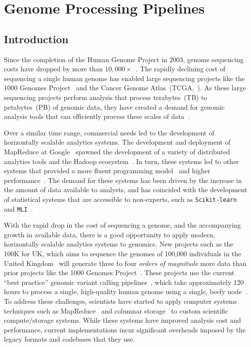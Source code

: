 \documentclass[masters]{ucbthesis}
\begin{document}
\chapter{Genome Processing Pipelines}

\section{Introduction}
\label{sec:introduction}

Since the completion of the Human Genome Project in 2003, genome sequencing costs have dropped
by more than $10,000\times$~\cite{nhgri}. The rapidly declining cost of sequencing a single human
genome has enabled large sequencing projects like the 1000 Genomes Project~\cite{siva08} and
the Cancer Genome Atlas~(TCGA,~\cite{weinstein13}). As these large sequencing projects perform
analysis that process terabytes~(TB) to petabytes~(PB) of genomic data, they have created a demand
for genomic analysis tools that can efficiently process these scales of data~\cite{schadt10, stein10}.

Over a similar time range, commercial needs led to the development of horizontally scalable analytics
systems. The development and deployment of MapReduce at Google~\cite{dean04, dean08} spawned
the development of a variety of distributed analytics tools and the Hadoop ecosystem~\cite{hadoop}.
In turn, these systems led to other systems that provided a more fluent programming
model~\cite{yu08} and higher performance~\cite{zaharia10}. The demand for these systems has
been driven by the increase in the amount of data available to analysts, and has coincided with the
development of statistical systems that are accessible to non-experts, such as
\texttt{Scikit-learn}~\cite{pedregosa11} and \texttt{MLI}~\cite{sparks13}.

With the rapid drop in the cost of sequencing a genome, and the accompanying growth in available data,
there is a good opportunity to apply modern, horizontally scalable analytics systems to genomics. New
projects such as the 100K for UK, which aims to sequence the genomes of 100,000 individuals in the
United Kingdom~\cite{uk100k} will generate three to four \emph{orders of magnitude} more data than
prior projects like the 1000 Genomes Project~\cite{siva08}. These projects use the current ``best
practice'' genomic variant calling pipelines~\cite{auwera13}, which take approximately 120 hours to
process a single, high-quality human genome using a single, beefy node~\cite{talwalkar14}. To address
these challenges, scientists have started to apply computer systems techniques such as
MapReduce~\cite{langmead09, mckenna10, schatz09} and columnar storage~\cite{fritz11} to custom
scientific compute/storage systems. While these systems have improved analysis cost and performance,
current implementations incur significant overheads imposed by the legacy formats and codebases that
they use.
\end{document}
